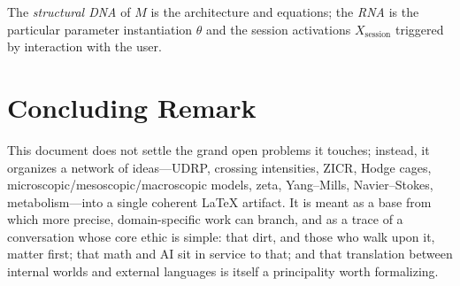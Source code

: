 \documentclass[11pt]{article}
\theoremstyle{definition}
\begin{document}
The \emph{structural DNA} of $M$ is the architecture and equations; the \emph{RNA} is the particular parameter instantiation $\theta$ and the session activations $X_{\text{session}}$ triggered by interaction with the user.

\section{Concluding Remark}

This document does not settle the grand open problems it touches; instead, it organizes a network of ideas---UDRP, crossing intensities, ZICR, Hodge cages, microscopic/mesoscopic/macroscopic models, zeta, Yang--Mills, Navier--Stokes, metabolism---into a single coherent LaTeX artifact. It is meant as a base from which more precise, domain-specific work can branch, and as a trace of a conversation whose core ethic is simple: that dirt, and those who walk upon it, matter first; that math and AI sit in service to that; and that translation between internal worlds and external languages is itself a principality worth formalizing.
\end{document}
